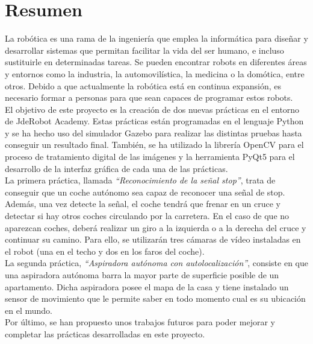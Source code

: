 \chapter*{Resumen}

La robótica es una rama de la ingeniería que emplea la informática para diseñar y desarrollar sistemas que permitan facilitar la vida del ser humano, e incluso sustituirle en determinadas tareas. Se pueden encontrar robots en diferentes áreas y entornos como la industria, la automovilística, la medicina o la domótica, entre otros. Debido a que actualmente la robótica está en continua expansión, es necesario formar a personas para que sean capaces de programar estos robots. \\

El objetivo de este proyecto es la creación de dos nuevas prácticas en el entorno de JdeRobot Academy. Estas prácticas están programadas en el lenguaje Python y se ha hecho uso del simulador Gazebo para realizar las distintas pruebas hasta conseguir un resultado final. También, se ha utilizado la librería OpenCV para el proceso de tratamiento digital de las imágenes y la herramienta PyQt5 para el desarrollo de la interfaz gráfica de cada una de las prácticas.\\

La primera práctica, llamada \textit{``Reconocimiento de la señal stop''}, trata de conseguir que un coche autónomo sea capaz de reconocer una señal de stop. Además, una vez detecte la señal, el coche tendrá que frenar en un cruce y detectar si hay otros coches circulando por la carretera. En el caso de que no aparezcan coches, deberá realizar un giro a la izquierda o a la derecha del cruce y continuar su camino. Para ello, se utilizarán tres cámaras de vídeo instaladas en el robot (una en el techo y dos en los faros del coche). \\

La segunda práctica, \textit{``Aspiradora autónoma con autolocalización''}, consiste en que una aspiradora autónoma barra la mayor parte de superficie posible de un apartamento. Dicha aspiradora posee el mapa de la casa y tiene instalado un sensor de movimiento que le permite saber en todo momento cual es su ubicación en el mundo.\\

Por último, se han propuesto unos trabajos futuros para poder mejorar y completar las prácticas desarrolladas en este proyecto.

